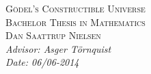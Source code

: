 \begin{titlepage}
	\vspace*{9.0cm}
	{\huge\textsc{Gödel's Constructible Universe}}\\[0.5cm]
	{\Large\textsc{Bachelor Thesis in Mathematics}}\\[0.5cm]
	{\large\textsc{Dan Saattrup Nielsen}}\\[8.0cm]
	{\large\textit{Advisor: Asger Törnquist}}\\[0.4cm]
	{\large\textit{Date: 06/06-2014}}
	\vspace*{\fill}
\end{titlepage}

\noindent
\pagestyle{fancy}
\fancyhead[LO]{\nouppercase\leftmark}
\fancyfoot{}
\setlength\headsep{35pt}

\thispagestyle{empty}
